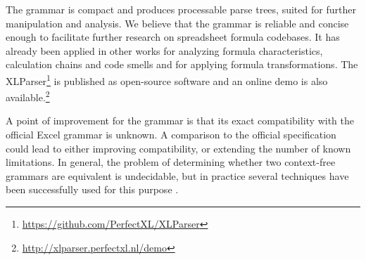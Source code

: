 \documentclass[conference]{IEEEtran}
\begin{document}
The grammar is compact and produces processable parse trees, suited for further manipulation and analysis. We believe that the grammar is reliable and concise enough to facilitate further research on spreadsheet formula codebases. It has already been applied in other works for analyzing formula characteristics, calculation chains and code smells and for applying formula transformations. The XLParser\footnote{\url{https://github.com/PerfectXL/XLParser}} is published as open-source software and an online demo is also available.\footnote{\url{http://xlparser.perfectxl.nl/demo}}

A point of improvement for the grammar is that its exact compatibility with the official Excel grammar is unknown.
A comparison to the official specification could lead to either improving compatibility, or extending the number of known limitations.
In general, the problem of determining whether two context-free grammars are equivalent is undecidable, but in practice several techniques have been successfully used for this purpose \cite{lammel2009introduction,fischer2012comparison}.




\end{document}

